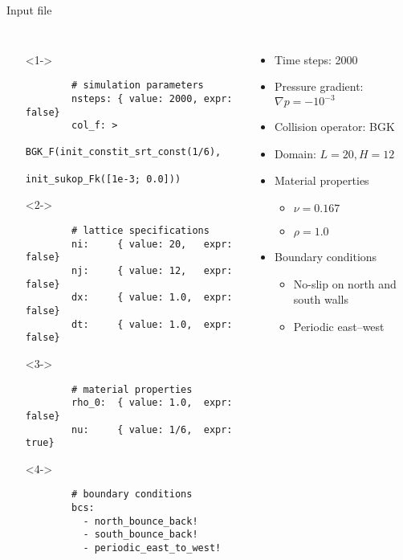 \documentclass[pdf]{beamer}
\begin{document}
\begin{frame}[fragile]{Input file}
  \begin{columns}
      \tiny
      \begin{itemize}
        \item[] <1->
      \begin{verbatim}
        # simulation parameters
        nsteps: { value: 2000, expr: false}
        col_f: >
               BGK_F(init_constit_srt_const(1/6),
                     init_sukop_Fk([1e-3; 0.0]))
      \end{verbatim}

    \item[] <2->
      \begin{verbatim}
        # lattice specifications
        ni:     { value: 20,   expr: false}
        nj:     { value: 12,   expr: false}
        dx:     { value: 1.0,  expr: false}
        dt:     { value: 1.0,  expr: false}
      \end{verbatim}

    \item[] <3->
      \begin{verbatim}
        # material properties
        rho_0:  { value: 1.0,  expr: false}
        nu:     { value: 1/6,  expr: true}
      \end{verbatim}

    \item[] <4->
      \begin{verbatim}
        # boundary conditions
        bcs:
          - north_bounce_back!
          - south_bounce_back!
          - periodic_east_to_west!
      \end{verbatim}
      \end{itemize}
      \small
      \begin{itemize}
        \item <1-> Time steps: 2000
        \item Pressure gradient: $\nabla p = -10^{-3}$
        \item Collision operator: BGK
        \item <2-> Domain: $L = 20, H = 12$
        \item <3-> Material properties 
          \begin{itemize}
            \item $\nu = 0.167$
            \item $\rho = 1.0$
          \end{itemize}
        \item <4-> Boundary conditions
          \begin{itemize}
            \item No-slip on north and south walls
            \item Periodic east--west
          \end{itemize}
      \end{itemize}
  \end{columns}
\end{frame}
\end{document}
